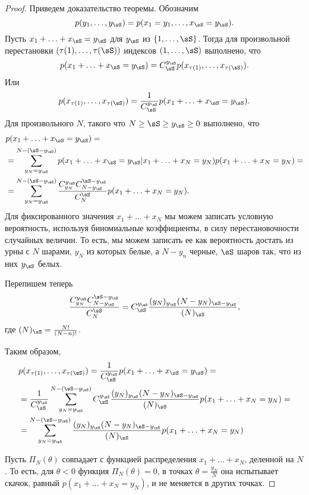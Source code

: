 \begin{proof}

Приведем доказательство теоремы.
Обозначим
\[
p(y_1, \ldots, y_{\sS}) = p(x_1 = y_1, \ldots, x_{\sS} = y_{\sS}).
\]
Пусть $x_1 + \ldots + x_{\sS} = y_{\sS}$ для $y_{\sS}$ из $\{1, \ldots, \sS\}$.
Тогда для произвольной перестановки $(\tau(1), \ldots, \tau(\sS))$ индексов $(1, \ldots, \sS)$ выполнено, что
\[
p(x_1 + \ldots + x_{\sS} = y_{\sS}) = C^{y_{\sS}}_{\sS} p(x_{\tau(1)}, \ldots, x_{\tau(\sS)}).
\]
Или 
\[
p(x_{\tau(1)}, \ldots, x_{\tau(\sS)}) = 
\frac{1}{C^{y_{\sS}}_{\sS}} p(x_1 + \ldots + x_{\sS} = y_{\sS}).
\]
Для произвольного $N$, такого что $N \geq \sS \geq y_{\sS} \geq 0$
выполнено, что
\begin{align*}
&p(x_1 + \ldots + x_{\sS} = y_{\sS}) =\\
&= \sum_{y_{N} = y_{\sS}}^{N - (\sS - y_{\sS})} p(x_1 + \ldots + x_{\sS} = y_{\sS} | x_1 + \ldots + x_{N} = y_{N}) p(x_1 + \ldots + x_{N} = y_{N}) = \\
&= \sum_{y_{N} = y_{\sS}}^{N - (\sS - y_{\sS})} \frac{C_{y_N}^{y_\sS} C_{N - y_{\sS}}^{\sS - y_\sS}}{C_N^\sS} p(x_1 + \ldots + x_{N} = y_{N}).
\end{align*}
Для фиксированного значения $x_1 + \ldots + x_{N}$ мы можем записать условную вероятность, используя биномиальные коэффициенты, в силу перестановочности случайных величин.
То есть, мы можем записать ее как вероятность достать из урны с $N$ шарами, $y_N$ из которых белые, а $N - y_n$ черные, $\sS$ шаров так, что из них $y_{\sS}$ белых.

Перепишем теперь 
\[
\frac{C_{y_N}^{y_\sS} C_{N - y_{\sS}}^{\sS - y_\sS}}{C_N^\sS} = C^{y_\sS}_{\sS} \frac{(y_N)_{y_\sS} (N - y_N)_{\sS - y_\sS}}{(N)_\sS},
\]
где $(N)_{\sS} = \frac{N!}{(N - n)!}$.

Таким образом, 
\begin{align*}
&p(x_{\tau(1)}, \ldots, x_{\tau(\sS)}) = 
\frac{1}{C^{y_{\sS}}_{\sS}} p(x_1 + \ldots + x_{\sS} = y_{\sS}) = \\
&= \frac{1}{C^{y_{\sS}}_{\sS}} \sum_{y_{N} = y_{\sS}}^{N - (\sS - y_{\sS})} C^{y_\sS}_{\sS} \frac{(y_N)_{y_\sS} (N - y_N)_{\sS - y_\sS}}{(N)_\sS} p(x_1 + \ldots + x_{N} = y_{N}) = \\
&= \sum_{y_{N} = y_{\sS}}^{N - (\sS - y_{\sS})} \frac{(y_N)_{y_\sS} (N - y_N)_{\sS - y_\sS}}{(N)_\sS} p(x_1 + \ldots + x_{N} = y_{N})
\end{align*}

Пусть $\Pi_N(\theta)$ совпадает с функцией распределения $x_1 + \ldots + x_{N}$, деленной на $N$.
То есть, для $\theta < 0$ функция $\Pi_N(\theta) = 0$, в точках $\theta = \frac{y_N}{N}$ она испытывает скачок, равный $p(x_1 + \ldots + x_{N} = y_{N})$, и не меняется в других точках.


\end{proof}

